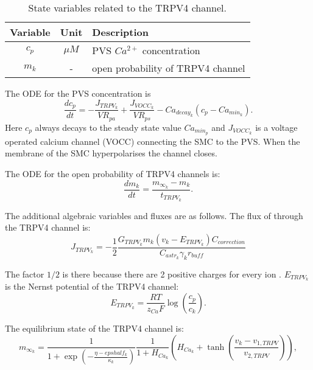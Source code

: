 			\begin{table}[h!]
				\small
				\centering
					\begin{tabular}{c c l}
				\hline
				Variable & Unit & Description \\
				\hline
				$c_p$ &  $\mu M$ & PVS $Ca^{2+}$  concentration \\
				$m_k$ & - & open probability of TRPV4 channel \\
				\hline
					\end{tabular}
					\caption{State variables related to the TRPV4 channel.}
					\label{tab:NVU12trpv4}
			\end{table}
			
	The ODE for the PVS \ca concentration is
		\begin{equation}
		\frac{d c_p}{dt} = - \frac{J_{TRPV_k}}{VR_{pa}} + \frac{J_{VOCC_k}}{VR_{ps}} - Ca_{decay_k} ( c_p - Ca_{min_k} ).
		\end{equation}
	Here $c_p$ always decays to the steady state value $Ca_{min_p}$ and $J_{VOCC_k}$ is a voltage operated calcium channel (VOCC) connecting the SMC to the PVS. When the membrane of the SMC hyperpolarises the channel closes. 
	
	The ODE for the open probability of TRPV4 channels is:
		\begin{equation}
		\frac{d m_k}{dt} = \frac{m_{\infty_k} - m_k}{t_{TRPV_k}}.
		\end{equation}
	
	The additional algebraic variables and fluxes are as follows.	
	The flux of \ca through the TRPV4 channel is:
		\begin{equation}
		J_{TRPV_k} = -\frac{1}{2} \frac{ G_{TRPV_k} m_k (v_k - E_{TRPV_k}) C_{correction} }{C_{astr_k} \gamma_k r_{buff}}
		\end{equation}
	
	The factor $1/2$ is there because there are 2 positive charges for every \ca ion \citep{Witthoft2013a}. 
	$E_{TRPV_k}$ is the Nernst potential of the TRPV4 channel:
		\begin{equation}
		E_{TRPV_k} = \frac{RT}{z_{Ca} F} \log \left(\frac{c_p}{c_k} \right).
		\end{equation}
				
	The equilibrium state of the TRPV4 channel is:
		\begin{equation}
		m_{\infty_k} = \frac{1}{1+\exp \left( {-\frac{\eta - epshalf_k}{\kappa_k}} \right) } 
						\frac{1}{1 + H_{Ca_k}} \left( H_{Ca_k} + \tanh \left( \frac{v_k - v_{1,TRPV}}{v_{2,TRPV}} \right) \right), 
		\end{equation}
	
